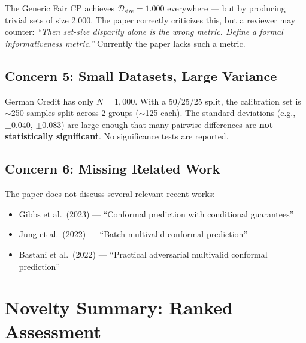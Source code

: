 \documentclass[11pt,a4paper]{article}
\begin{document}
The Generic Fair CP achieves $\mathcal{D}_{\text{size}} = 1.000$ everywhere --- but by producing trivial sets of size 2.000. The paper correctly criticizes this, but a reviewer may counter: \emph{``Then set-size disparity alone is the wrong metric. Define a formal informativeness metric.''} Currently the paper lacks such a metric.

\subsection{Concern 5: Small Datasets, Large Variance}

German Credit has only $N = 1{,}000$. With a 50/25/25 split, the calibration set is $\sim$250 samples split across 2 groups ($\sim$125 each). The standard deviations (e.g., $\pm 0.040$, $\pm 0.083$) are large enough that many pairwise differences are \textbf{not statistically significant}. No significance tests are reported.

\subsection{Concern 6: Missing Related Work}

The paper does not discuss several relevant recent works:
\begin{itemize}[leftmargin=2em]
    \item Gibbs et al.\ (2023) --- ``Conformal prediction with conditional guarantees''
    \item Jung et al.\ (2022) --- ``Batch multivalid conformal prediction''
    \item Bastani et al.\ (2022) --- ``Practical adversarial multivalid conformal prediction''
\end{itemize}

\section{Novelty Summary: Ranked Assessment}
\label{sec:ranked}
\end{document}
